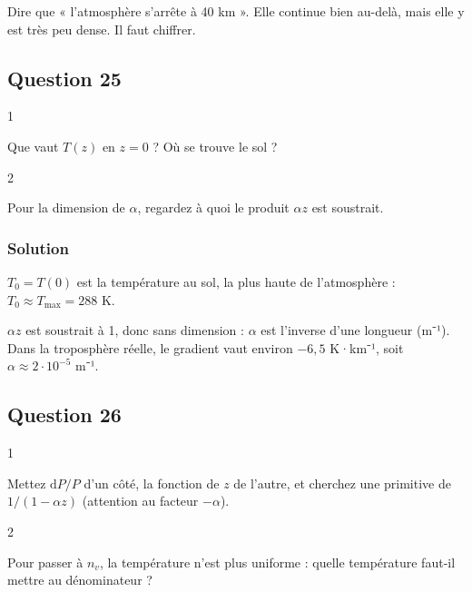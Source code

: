\documentclass[11pt,a4paper]{article}
\begin{document}
\begin{piege}

Dire que « l'atmosphère s'arrête à 40 km ». Elle continue bien au-delà, mais elle y est très peu dense. Il faut chiffrer.

\end{piege}

\hypertarget{question-25}{%
\subsection{Question 25}\label{question-25}}

\begin{indication}{1}

Que vaut \(T(z)\) en \(z=0\) ? Où se trouve le sol ?

\end{indication}

\begin{indication}{2}

Pour la dimension de \(\alpha\), regardez à quoi le produit \(\alpha z\) est soustrait.

\end{indication}

\hypertarget{solution-24}{%
\subsubsection{Solution}\label{solution-24}}

\(T_0=T(0)\) est la température au sol, la plus haute de l'atmosphère : \(T_0\approx T_{\max}=288\) K.

\(\alpha z\) est soustrait à 1, donc sans dimension : \(\alpha\) est l'inverse d'une longueur (m⁻¹). Dans la troposphère réelle, le gradient vaut environ \(-6{,}5\) K·km⁻¹, soit \(\alpha\approx2\cdot10^{-5}\) m⁻¹.

\hypertarget{question-26}{%
\subsection{Question 26}\label{question-26}}

\begin{indication}{1}

Mettez \(\mathrm dP/P\) d'un côté, la fonction de \(z\) de l'autre, et cherchez une primitive de \(1/(1-\alpha z)\) (attention au facteur \(-\alpha\)).

\end{indication}

\begin{indication}{2}

Pour passer à \(n_v\), la température n'est plus uniforme : quelle température faut-il mettre au dénominateur ?

\end{indication}
\end{document}
